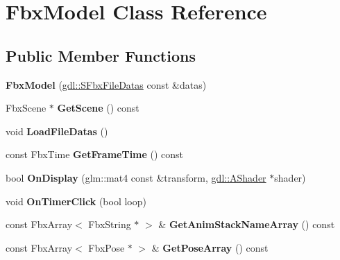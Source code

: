 \hypertarget{class_fbx_model}{\section{Fbx\-Model Class Reference}
\label{class_fbx_model}
}
\subsection*{Public Member Functions}
\begin{DoxyCompactItemize}
\item 
\hypertarget{class_fbx_model_af59fde217d097494d1d8025fd417c4df}{{\bfseries Fbx\-Model} (\hyperlink{structgdl_1_1_s_fbx_file_datas}{gdl\-::\-S\-Fbx\-File\-Datas} const \&datas)}\label{class_fbx_model_af59fde217d097494d1d8025fd417c4df}

\item 
\hypertarget{class_fbx_model_a99dc5358193dde439e9ca71c9e13f99c}{Fbx\-Scene $\ast$ {\bfseries Get\-Scene} () const }\label{class_fbx_model_a99dc5358193dde439e9ca71c9e13f99c}

\item 
\hypertarget{class_fbx_model_aa3705619e47019dc6d45291c92bb3d13}{void {\bfseries Load\-File\-Datas} ()}\label{class_fbx_model_aa3705619e47019dc6d45291c92bb3d13}

\item 
\hypertarget{class_fbx_model_a3f5e2a7624089d8824615375935c127f}{const Fbx\-Time {\bfseries Get\-Frame\-Time} () const }\label{class_fbx_model_a3f5e2a7624089d8824615375935c127f}

\item 
\hypertarget{class_fbx_model_a205eb9a9ffa9eb9730e1b22337c7ce6d}{bool {\bfseries On\-Display} (glm\-::mat4 const \&transform, \hyperlink{classgdl_1_1_a_shader}{gdl\-::\-A\-Shader} $\ast$shader)}\label{class_fbx_model_a205eb9a9ffa9eb9730e1b22337c7ce6d}

\item 
\hypertarget{class_fbx_model_ac69b6f59ae8de1023b693a385828b6ce}{void {\bfseries On\-Timer\-Click} (bool loop)}\label{class_fbx_model_ac69b6f59ae8de1023b693a385828b6ce}

\item 
\hypertarget{class_fbx_model_a86229472e2a025bc80b6c96e7abca012}{const Fbx\-Array$<$ Fbx\-String $\ast$ $>$ \& {\bfseries Get\-Anim\-Stack\-Name\-Array} () const }\label{class_fbx_model_a86229472e2a025bc80b6c96e7abca012}

\item 
\hypertarget{class_fbx_model_a0d06f60772921b3024ea7e4627b08769}{const Fbx\-Array$<$ Fbx\-Pose $\ast$ $>$ \& {\bfseries Get\-Pose\-Array} () const }\label{class_fbx_model_a0d06f60772921b3024ea7e4627b08769}


\end{DoxyCompactItemize}

